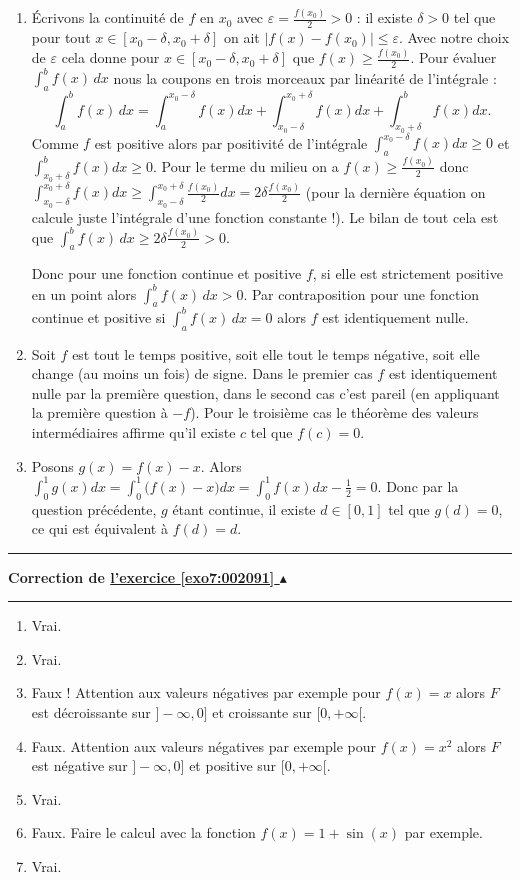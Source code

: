 \documentclass[11pt,a4paper]{article}
\renewcommand{\epsilon}{\varepsilon}
\newcounter{exo}
\newcommand{\correction}[1]{\hypertarget{cor7:#1}{}\label{cor7:#1}{\bf Correction de \hyperlink{exo7:#1}{l'exercice \ref{exo7:#1} $\blacktriangle$}}\vspace{1mm}\hrule\vspace{1mm}}
\newcommand{\fincorrection}{\vspace{1mm}\hrule\vspace*{7mm}}
\begin{document}
 \begin{enumerate}
  \item \'Ecrivons la continuité de $f$ en $x_0$ avec $\epsilon = \frac {f(x_0)}{2} > 0$ :
il existe $\delta >0$ tel que pour tout $x\in [x_0-\delta, x_0+\delta]$ on ait $|f(x)-f(x_0)| \leqslant \epsilon$.
Avec notre choix de $\epsilon$ cela donne pour $x\in [x_0-\delta, x_0+\delta]$ que $f(x) \geqslant \frac {f(x_0)}{2}$.
Pour évaluer $\int_a^b f(x) \, dx$ nous la coupons en trois morceaux par linéarité de l'intégrale :
$$\int_a^b f(x) \, dx = \int_a^{x_0-\delta} f(x) dx +  \int_{x_0-\delta}^{x_0+\delta} f(x) dx +  \int_{x_0+\delta}^b f(x) dx.$$
Comme $f$ est positive alors par positivité de l'intégrale $\int_a^{x_0-\delta} f(x) dx \geqslant 0$ et
$\int_{x_0+\delta}^b f(x) dx \geqslant 0$. Pour le terme du milieu on a $f(x) \geqslant \frac {f(x_0)}{2}$ donc
$\int_{x_0-\delta}^{x_0+\delta} f(x) dx \geqslant \int_{x_0-\delta}^{x_0+\delta} \frac {f(x_0)}{2} dx =
2\delta\frac {f(x_0)}{2}$ (pour la dernière équation on calcule juste l'intégrale d'une fonction constante !).
Le bilan de tout cela est que $\int_a^b f(x) \, dx \geqslant 2\delta\frac {f(x_0)}{2} >0$.

Donc pour une fonction continue et positive $f$, si elle est strictement positive en un point alors  $\int_a^b f(x) \, dx >0$.
Par contraposition pour une fonction continue et positive si $\int_a^b f(x) \, dx =0$ alors
$f$ est identiquement nulle.


  \item Soit $f$ est tout le temps positive, soit elle tout le temps négative, soit elle change 
(au moins un fois) de signe. Dans le premier cas $f$ est identiquement nulle par la première question, 
dans le second cas c'est pareil (en appliquant la première question à $-f$). Pour le troisième cas 
le théorème des valeurs intermédiaires affirme qu'il existe $c$ tel que $f(c)=0$.

  \item Posons $g(x) = f(x)-x$. Alors $\int_0^1 g(x) dx = \int_0^1 \big( f(x) - x \big)  dx= \int_0^1 f(x) dx - \frac 12 = 0$.
Donc par la question précédente, $g$ étant continue, il existe $d \in [0,1]$ tel que $g(d)=0$, ce qui est équivalent à $f(d)=d$.
  \end{enumerate}
\fincorrection
\correction{002091}
  \begin{enumerate}
  \item Vrai.
  \item Vrai.
  \item Faux ! Attention aux valeurs négatives par exemple pour $f(x)=x$ alors $F$ est décroissante sur $]-\infty,0]$ et croissante sur $[0,+\infty[$.
  \item Faux. Attention aux valeurs négatives par exemple pour $f(x)=x^2$ alors $F$ est négative sur $]-\infty,0]$ et positive sur $[0,+\infty[$.
  \item Vrai.
  \item Faux. Faire le calcul avec la fonction $f(x) = 1+\sin(x)$ par exemple.
  \item Vrai.
  \end{enumerate}
\end{document}
